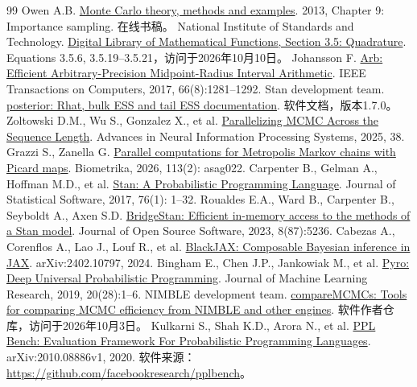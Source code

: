 \begin{thebibliography}{99}\small\setlength{\itemsep}{2pt}
 Owen A.B. \href{https://artowen.su.domains/mc/}{Monte Carlo theory, methods and examples}. 2013, Chapter 9: Importance sampling. 在线书稿。
 National Institute of Standards and Technology. \href{https://dlmf.nist.gov/3.5}{Digital Library of Mathematical Functions, Section 3.5: Quadrature}. Equations 3.5.6, 3.5.19--3.5.21，访问于2026年10月10日。
 Johansson F. \href{https://doi.org/10.1109/TC.2017.2690633}{Arb: Efficient Arbitrary-Precision Midpoint-Radius Interval Arithmetic}. IEEE Transactions on Computers, 2017, 66(8):1281--1292.
 Stan development team. \href{https://mc-stan.org/posterior/reference/rhat.html}{posterior: Rhat, bulk ESS and tail ESS documentation}. 软件文档，版本1.7.0。
 Zoltowski D.M., Wu S., Gonzalez X., et al. \href{https://proceedings.nips.cc/paper_files/paper/2025/hash/202886ee1c9ca735cb5bff3a00a69883-Abstract-Conference.html}{Parallelizing MCMC Across the Sequence Length}. Advances in Neural Information Processing Systems, 2025, 38.
 Grazzi S., Zanella G. \href{https://doi.org/10.1093/biomet/asag022}{Parallel computations for Metropolis Markov chains with Picard maps}. Biometrika, 2026, 113(2): asag022.
 Carpenter B., Gelman A., Hoffman M.D., et al. \href{https://doi.org/10.18637/jss.v076.i01}{Stan: A Probabilistic Programming Language}. Journal of Statistical Software, 2017, 76(1): 1--32.
 Roualdes E.A., Ward B., Carpenter B., Seyboldt A., Axen S.D. \href{https://doi.org/10.21105/joss.05236}{BridgeStan: Efficient in-memory access to the methods of a Stan model}. Journal of Open Source Software, 2023, 8(87):5236.
 Cabezas A., Corenflos A., Lao J., Louf R., et al. \href{https://arxiv.org/abs/2402.10797}{BlackJAX: Composable Bayesian inference in JAX}. arXiv:2402.10797, 2024.
 Bingham E., Chen J.P., Jankowiak M., et al. \href{https://jmlr.org/papers/v20/18-403.html}{Pyro: Deep Universal Probabilistic Programming}. Journal of Machine Learning Research, 2019, 20(28):1--6.
 NIMBLE development team. \href{https://github.com/nimble-dev/compareMCMCs}{compareMCMCs: Tools for comparing MCMC efficiency from NIMBLE and other engines}. 软件作者仓库，访问于2026年10月3日。
 Kulkarni S., Shah K.D., Arora N., et al. \href{https://arxiv.org/abs/2010.08886v1}{PPL Bench: Evaluation Framework For Probabilistic Programming Languages}. arXiv:2010.08886v1, 2020. 软件来源：\url{https://github.com/facebookresearch/pplbench}。

\end{thebibliography}
